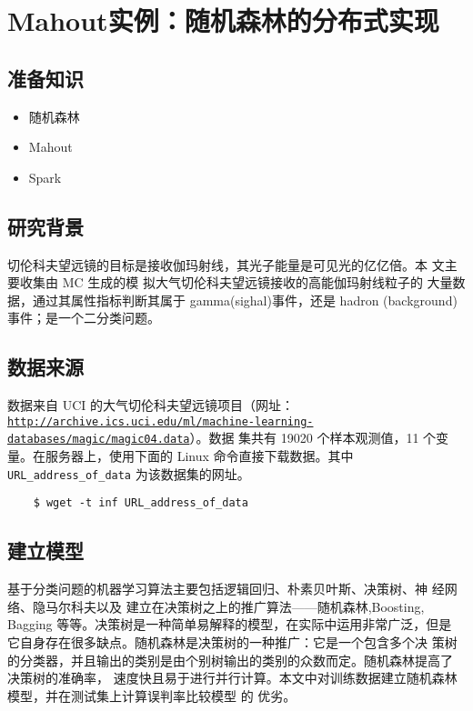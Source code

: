 \section{Mahout实例：随机森林的分布式实现}\label{ux5b9eux4f8bux5206ux6790ux968fux673aux68eeux6797ux7684ux5e76ux884cux5b9eux73b0}

\subsection{准备知识}\label{ux51c6ux5907ux77e5ux8bc6}

\begin{itemize}
\itemsep1pt\parskip0pt
\item
  随机森林
\item
  Mahout
\item
  Spark
\end{itemize}

\subsection{研究背景}\label{ux7814ux7a76ux80ccux666f}

切伦科夫望远镜的目标是接收伽玛射线，其光子能量是可见光的亿亿倍。本
文主要收集由 MC 生成的模 拟大气切伦科夫望远镜接收的高能伽玛射线粒子的
大量数据，通过其属性指标判断其属于 gamma(sighal)事件，还是 hadron
(background)事件；是一个二分类问题。

\subsection{数据来源}\label{ux6570ux636eux6765ux6e90}

数据来自 UCI 的大气切伦科夫望远镜项目（网址：
\href{http://archive.ics.uci.edu/ml/machine-learning-databases/magic/magic04.data}{\lstinline|http://archive.ics.uci.edu/ml/machine-learning-databases/magic/magic04.data|}）。数据
集共有 19020 个样本观测值，11 个变量。在服务器上，使用下面的 Linux
命令直接下载数据。其中 \texttt{URL\_address\_of\_data} 为该数据集的网址。

\begin{lstlisting}
	$ wget -t inf URL_address_of_data
\end{lstlisting}

\subsection{建立模型}\label{ux5efaux7acbux6a21ux578b}

基于分类问题的机器学习算法主要包括逻辑回归、朴素贝叶斯、决策树、神
经网络、隐马尔科夫以及
建立在决策树之上的推广算法------随机森林,Boosting, Bagging
等等。决策树是一种简单易解释的模型，在实际中运用非常广泛，但是
它自身存在很多缺点。随机森林是决策树的一种推广：它是一个包含多个决
策树的分类器，并且输出的类别是由个别树输出的类别的众数而定。随机森林提高了
决策树的准确率，
速度快且易于进行并行计算。本文中对训练数据建立随机森林模型，并在测试集上计算误判率比较模型
的 优劣。

